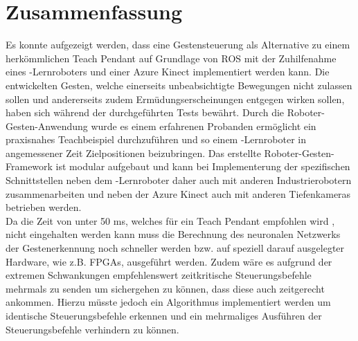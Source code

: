 \section{Zusammenfassung}
Es konnte aufgezeigt werden, dass eine Gestensteuerung als Alternative zu einem herkömmlichen Teach Pendant auf Grundlage von ROS mit der Zuhilfenahme eines -Lernroboters und einer Azure Kinect implementiert werden kann. Die entwickelten Gesten, welche einerseits unbeabsichtigte Bewegungen nicht zulassen sollen und andererseits zudem Ermüdungserscheinungen entgegen wirken sollen, haben sich während der durchgeführten Tests bewährt. Durch die Roboter-Gesten-Anwendung wurde es einem erfahrenen Probanden ermöglicht ein praxisnahes Teachbeispiel durchzuführen und so einem -Lernroboter in angemessener Zeit Zielpositionen beizubringen. Das erstellte Roboter-Gesten-Framework ist modular aufgebaut und kann bei Implementerung der spezifischen Schnittstellen neben dem -Lernroboter daher auch mit anderen Industrierobotern zusammenarbeiten und neben der Azure Kinect auch mit anderen Tiefenkameras betrieben werden.\\

Da die Zeit von unter 50 ms, welches für ein Teach Pendant empfohlen wird \cite[55]{prassler_advances_2004}, nicht eingehalten werden kann  muss die Berechnung des neuronalen Netzwerks der Gestenerkennung noch schneller werden bzw. auf speziell darauf ausgelegter Hardware, wie z.B. FPGAs, ausgeführt werden. Zudem wäre es aufgrund der extremen Schwankungen empfehlenswert zeitkritische Steuerungsbefehle mehrmals zu senden um sichergehen zu können, dass diese auch zeitgerecht ankommen. Hierzu müsste jedoch ein Algorithmus implementiert werden um identische Steuerungsbefehle erkennen und ein mehrmaliges Ausführen der Steuerungsbefehle verhindern zu können.\\


